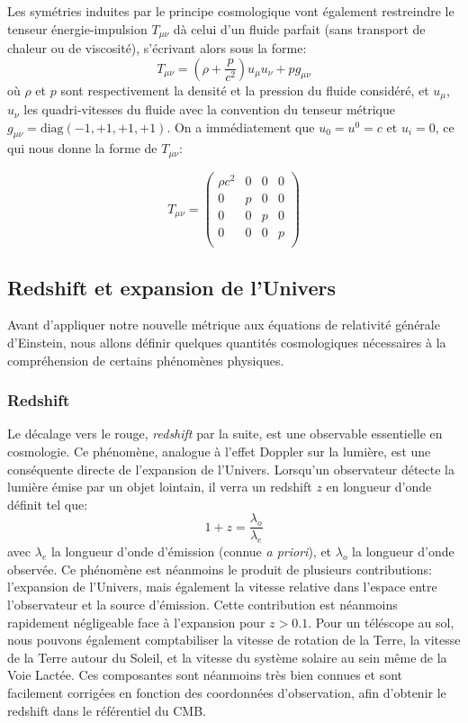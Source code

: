 \documentclass[../main/main.tex]{subfiles}
\begin{document}
Les symétries induites par le principe cosmologique vont également
restreindre le tenseur énergie-impulsion $T_{\mu\nu}$ dà celui d'un
fluide parfait (sans transport de chaleur ou de viscosité), s'écrivant
alors sous la forme:
\begin{equation}
  \label{eq:Tmunu}
  T_{\mu\nu} = \left( \rho + \frac{p}{c^{2}}\right)u_{\mu}u_{\nu}+pg_{\mu\nu}
\end{equation}
où $\rho$ et $p$ sont respectivement la densité et la pression du fluide
considéré, et $u_{\mu}$, $u_{\nu}$ les quadri-vitesses du fluide avec la
convention du tenseur métrique $g_{\mu\nu}=\text{diag}(-1,+1,+1,+1)$.
On a immédiatement que $u_{0}=u^{0}=c$ et $u_{i}=0$, ce qui nous donne
la forme de $T_{\mu\nu}$:

\begin{equation}
  \label{eq:Tmunusimple}
  T_{\mu\nu}=
  \begin{pmatrix}
    \rho c^{2}&0&0&0\\
    0&p&0&0\\ 
    0&0&p&0\\ 
    0&0&0&p\\ 
\end{pmatrix} 
\end{equation}

\subsection{Redshift et expansion de l'Univers}

Avant d'appliquer notre nouvelle métrique aux équations de relativité
générale d'Einstein, nous allons définir quelques quantités
cosmologiques nécessaires à la compréhension de certains phénomènes
physiques. 

\subsubsection{Redshift}

Le décalage vers le rouge, \textit{redshift} par la suite, est une
observable essentielle en cosmologie. Ce phénomène, analogue à l'effet
Doppler sur la lumière, est une conséquente directe de l'expansion de
l'Univers.
Lorsqu'un observateur détecte la lumière émise par un objet lointain, il
verra un redshift $z$ en longueur d'onde définit tel que:
\begin{equation}
  \label{eq:redshift}
  1+z = \frac{\lambda_{o}}{\lambda_{e}}
\end{equation}
avec $\lambda_{e}$ la longueur d'onde d'émission (connue \textit{a priori}), et $\lambda_{o}$ la
longueur d'onde observée. Ce phénomène est néanmoins le produit de
plusieurs contributions: l'expansion de l'Univers, mais également la
vitesse relative dans l'espace entre l'observateur et la source
d'émission. Cette contribution est néanmoins rapidement négligeable face
à l'expansion pour $z>0.1$. Pour un téléscope au sol, nous pouvons également comptabiliser la
vitesse de rotation de la Terre, la vitesse de la Terre autour du
Soleil, et la vitesse du système solaire au sein même de la Voie
Lactée. Ces composantes sont néanmoins très bien connues et sont
facilement corrigées en fonction des coordonnées d'observation, afin
d'obtenir le redshift dans le référentiel du CMB.
\end{document}
